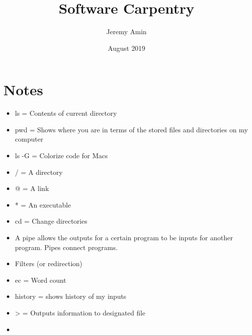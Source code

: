 \documentclass{article}
\title{Software Carpentry}
\author{Jeremy Amin}
\date{August 2019}
\begin{document}
\maketitle

\section{Notes}

\begin{itemize}
    \item ls = Contents of current directory
    \item pwd = Shows where you are in terms of the stored files and directories on my computer
    \item ls -G = Colorize code for Macs
    \item / = A directory
    \item @ = A link
    \item * = An executable
    \item cd = Change directories
    \item A pipe allows the outputs for a certain program to be inputs for another program. Pipes connect programs.
    \item Filters (or redirection) 
    \item ec = Word count
    \item history = shows history of my inputs
    \item > = Outputs information to designated file
    \item 
\end{itemize}
\end{document}
